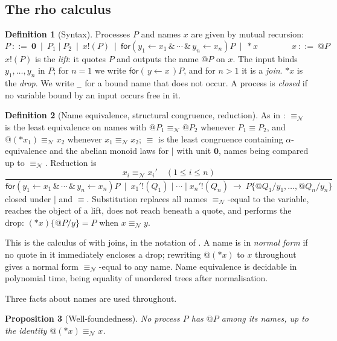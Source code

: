 \documentclass[11pt]{article}
\makeatletter
\theoremstyle{definition}
\newtheorem{definition}{Definition}[section]
\theoremstyle{plain}
\newtheorem{proposition}[definition]{Proposition}
\theoremstyle{remark}
\newcommand{\quo}[1]{@#1}
\newcommand{\drp}[1]{{*}#1}
\newcommand{\inp}[3]{\mathsf{for}(\,#1 \leftarrow #2\,)#3}
\newcommand{\out}[2]{#1!(#2)}
\newcommand{\nequiv}{\equiv_{\mathcal{N}}}
\newcommand{\nil}{\mathbf{0}}
\newcommand{\wild}{\mathord{\underline{\hspace{0.5em}}}}
\makeatother
\begin{document}
\subsection{The rho calculus}\label{sec:rho}

\begin{definition}[Syntax]
Processes $P$ and names $x$ are given by mutual recursion:
\[
P \ ::=\ \nil \ \mid\ P_1 \mid P_2 \ \mid\ \out{x}{P}
   \ \mid\ \mathsf{for}(y_1 \leftarrow x_1 \,\&\, \cdots \,\&\, y_n \leftarrow x_n)P
   \ \mid\ \drp{x}
\qquad\qquad
x \ ::=\ \quo{P}
\]
$\out{x}{P}$ is the \emph{lift}: it quotes $P$ and outputs the name
$\quo{P}$ on $x$. The input binds $y_1,\dots,y_n$ in $P$; for $n = 1$ we
write $\inp{y}{x}{P}$, and for $n > 1$ it is a \emph{join}. $\drp{x}$ is
the \emph{drop}. We write $\wild$ for a bound name that does not occur. A
process is \emph{closed} if no variable bound by an input occurs free in
it.
\end{definition}

\begin{definition}[Name equivalence, structural congruence, reduction]
As in \cite{NWNS}: $\nequiv$ is the least equivalence on names with
$\quo{P_1} \nequiv \quo{P_2}$ whenever $P_1 \equiv P_2$, and
$\quo{(\drp{x_1})} \nequiv x_2$ whenever $x_1 \nequiv x_2$; $\equiv$ is
the least congruence containing $\alpha$-equivalence and the abelian
monoid laws for $\mid$ with unit $\nil$, names being compared up to
$\nequiv$. Reduction is
\[
\frac{x_i \nequiv x_i' \quad (1 \le i \le n)}
     {\mathsf{for}(y_1 \leftarrow x_1 \,\&\, \cdots \,\&\, y_n \leftarrow x_n)P
      \ \mid\ \out{x_1'}{Q_1} \mid \cdots \mid \out{x_n'}{Q_n}
      \ \to\ P\{\quo{Q_1}/y_1, \dots, \quo{Q_n}/y_n\}}
\]
closed under $\mid$ and $\equiv$. Substitution replaces all names
$\nequiv$-equal to the variable, reaches the object of a lift, does not
reach beneath a quote, and performs the drop:
$(\drp{x})\{\quo{P}/y\} = P$ when $x \nequiv y$.
\end{definition}

This is the calculus of \cite{RHO} with joins, in the notation of
\cite{NWNS}. A name is in \emph{normal form} if no quote in it
immediately encloses a drop; rewriting $\quo{(\drp{x})}$ to $x$
throughout gives a normal form $\nequiv$-equal to any name. Name
equivalence is decidable in polynomial time, being equality of unordered
trees after normalisation.

Three facts about names are used throughout.

\begin{proposition}[Well-foundedness]\label{prop:wf}
No process $P$ has $\quo{P}$ among its names, up to the identity
$\quo{(\drp{x})} \nequiv x$.
\end{proposition}
\end{document}
